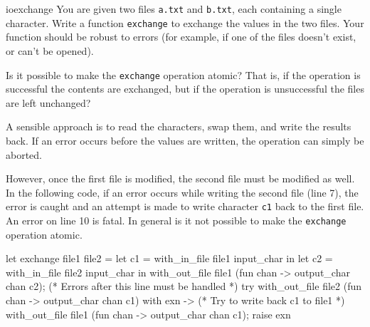 %
\begin{exercise}{ioexchange}
You are given two files \hbox{\lstinline+a.txt+}
and \hbox{\lstinline+b.txt+}, each containing a single character.
Write a function \hbox{\lstinline+exchange+} to exchange the values in
the two files.  Your function should be robust to errors (for example,
if one of the files doesn't exist, or can't be opened).

Is it possible to make the \hbox{\lstinline+exchange+} operation
atomic?  That is, if the operation is successful the contents are
exchanged, but if the operation is unsuccessful the files are left
unchanged?

\begin{answer}\ifanswers
A sensible approach is to read the characters, swap them, and write the results back.
If an error occurs before the values are written, the operation can simply be aborted.

However, once the first file is modified, the second file must be modified as well.  In the
following code, if an error occurs while writing the second file (line 7), the error is caught and
an attempt is made to write character \hbox{\lstinline/c1/} back to the first file.  An error on line 10 is
fatal.  In general is it not possible to make the \hbox{\lstinline/exchange/} operation atomic.

\begin{ocamlnum}
let exchange file1 file2 =
   let c1 = with_in_file file1 input_char in
   let c2 = with_in_file file2 input_char in
   with_out_file file1 (fun chan -> output_char chan c2);
   (* Errors after this line must be handled *)
   try
      with_out_file file2 (fun chan -> output_char chan c1)
   with exn ->
      (* Try to write back c1 to file1 *)
      with_out_file file1 (fun chan -> output_char chan c1);
      raise exn
\end{ocamlnum}
\fi\end{answer}   
\end{exercise}

